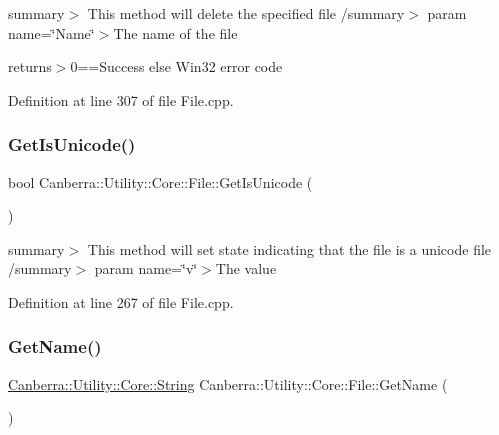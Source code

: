 summary$>$ This method will delete the specified file /summary$>$ param name=\char`\"{}\+Name\char`\"{}$>$The name of the file

returns$>$0==Success else Win32 error code

Definition at line 307 of file File.\+cpp.

\mbox{\label{class_canberra_1_1_utility_1_1_core_1_1_file_a4042e135db85e44810d0830567b036c4_a4042e135db85e44810d0830567b036c4}} 
\subsubsection{\texorpdfstring{Get\+Is\+Unicode()}{GetIsUnicode()}}
{\footnotesize\ttfamily bool Canberra\+::\+Utility\+::\+Core\+::\+File\+::\+Get\+Is\+Unicode (\begin{DoxyParamCaption}{ }\end{DoxyParamCaption})}

summary$>$ This method will set state indicating that the file is a unicode file /summary$>$ param name=\char`\"{}v\char`\"{}$>$The value

Definition at line 267 of file File.\+cpp.

\mbox{\label{class_canberra_1_1_utility_1_1_core_1_1_file_a13f16e16abcd43806ffcae5739e57486_a13f16e16abcd43806ffcae5739e57486}} 
\subsubsection{\texorpdfstring{Get\+Name()}{GetName()}}
{\footnotesize\ttfamily \hyperlink{class_canberra_1_1_utility_1_1_core_1_1_string}{Canberra\+::\+Utility\+::\+Core\+::\+String} Canberra\+::\+Utility\+::\+Core\+::\+File\+::\+Get\+Name (\begin{DoxyParamCaption}{ }\end{DoxyParamCaption})}

